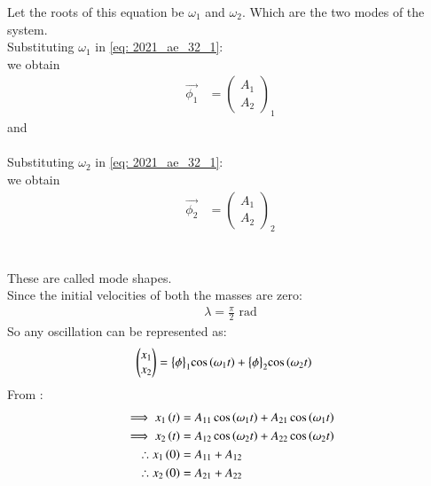 \documentclass[journal,12pt,twocolumn]{IEEEtran}
\theoremstyle{remark}
\begin{document}
Let the roots of this equation be $ \omega_1$ and $ \omega_2$. Which are the two modes of the system.\\
Substituting $ \omega_1$ in \eqref{eq: 2021_ae_32_1}:\\
we obtain 
\begin{align}
 \vec{\phi_1}&= \begin{pmatrix}
A_1\\
A_2
\end{pmatrix}_1
\end{align}
and \\\\
Substituting $ \omega_2$ in \eqref{eq: 2021_ae_32_1}:\\
we obtain 
\begin{align}
 \vec{\phi_2}&=\begin{pmatrix}
A_1\\
A_2
\end{pmatrix}_2 
\end{align}
\\\\
These are called mode shapes.\\
Since the initial velocities of both the masses are zero:
\begin{align}
\lambda = \frac{\pi}{2} \text{ rad}
\end{align}
So any oscillation can be represented as:
\begin{align}
\begin{pmatrix}
x_1\\
x_2
\end{pmatrix}
&= \bigl\{ \phi \bigl\}_1\cos{\ensuremath{\left(\omega_1 t\right)}} +\bigl\{ \phi \bigl\}_2\cos{\ensuremath{\left(\omega_2 t\right)}}
\end{align}
From :
\begin{align}
\implies x_1\left(t\right)&= A_{11}\cos{\ensuremath{\left(\omega_1 t\right)}} + A_{21}\cos{\ensuremath{\left(\omega_1 t\right)}}\\
\implies x_2\left(t\right)&= A_{12}\cos{\ensuremath{\left(\omega_2 t\right)}} + A_{22}\cos{\ensuremath{\left(\omega_2 t\right)}}\\
\therefore x_1\left(0\right) &= A_{11} + A_{12}\\
\therefore x_2\left(0\right) &= A_{21} + A_{22}
\end{align}
\end{document}
